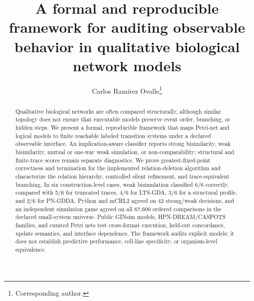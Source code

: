 \documentclass{ws-jbcb}
\numberwithin{equation}{section}
\begin{document}
\catchline{}{}{}{}{}

\title{A formal and reproducible framework for auditing observable behavior in
qualitative biological network models}

\author{Carlos Ramirez Ovalle\footnote{Corresponding author.}}

\address{Department of Natural Sciences and Mathematics, Pontificia Universidad
Javeriana Cali, Calle 18 No. 118-250, Via a Pance, Cali, Valle del Cauca,
Colombia\\
carlosovalle@javerianacali.edu.co}

\maketitle

\begin{abstract}
Qualitative biological networks are often compared structurally, although
similar topology does not ensure that executable models preserve event order,
branching, or hidden steps. We present a formal, reproducible framework that maps
Petri-net and logical models to finite reachable labeled transition systems under
a declared observable interface. An implication-aware classifier reports strong
bisimilarity, weak bisimilarity, mutual or one-way weak simulation, or
non-comparability; structural and finite-trace scores remain separate
diagnostics. We prove greatest-fixed-point correctness and termination for the
implemented relation-deletion algorithm and characterize the relation hierarchy,
controlled silent refinement, and trace-equivalent branching. In six
construction-level cases, weak bisimulation classified 6/6 correctly, compared
with 5/6 for truncated traces, 4/6 for LTS-GDA, 3/6 for a structural profile, and
2/6 for PN-GDDA. Python and mCRL2 agreed on 42 strong/weak decisions, and an
independent simulation game agreed on all 67,600 ordered comparisons in the
declared small-system universe. Public GINsim models, HPN-DREAM/CASPOTS families,
and curated Petri nets test cross-format execution, held-out concordance, update
semantics, and interface dependence. The framework audits explicit models; it
does not establish predictive performance, cell-line specificity, or
organism-level equivalence.
\end{abstract}

\end{document}
